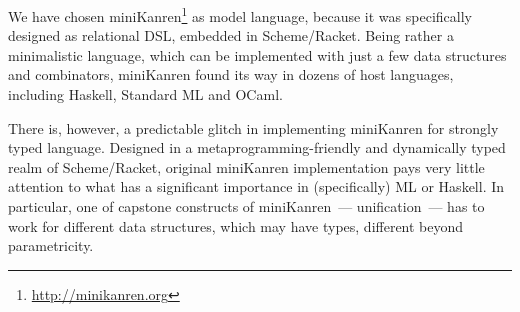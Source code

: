 \documentclass[10pt, oneside, nocopyrightspace]{sigplanconf}
\begin{document}
\begin{comment}
Many logic programming languages, such as Prolog, Mercury
or Curry
to some extent
can be considered as relational.
\end{comment}

We have chosen miniKanren\footnote{\url{http://minikanren.org}} 
as model language, because it was specifically designed as relational DSL, embedded in Scheme/Racket. 
Being rather a minimalistic language, which can be implemented with just a few data structures and
combinators, miniKanren found its way in dozens of host languages, including Haskell, 
Standard ML and OCaml.

There is, however, a predictable glitch in implementing miniKanren for strongly typed language. 
Designed in a metaprogramming-friendly and dynamically typed realm of Scheme/Racket, original 
miniKanren implementation pays very little attention to what has a significant importance in (specifically) 
ML or Haskell. In particular, one of capstone constructs of miniKanren~--- unification~--- has to work for 
different data structures, which may have types, different beyond parametricity.
\end{document}
